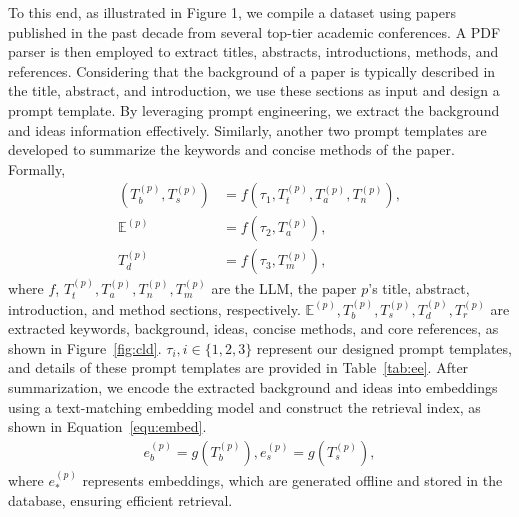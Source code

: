 \documentclass{article}
\theoremstyle{plain}
\theoremstyle{definition}
\theoremstyle{remark}
\begin{document}
To this end, as illustrated in Figure 1, we compile a dataset using papers published in the past decade from several top-tier academic conferences. A PDF parser is then employed to extract titles, abstracts, introductions, methods, and references.
Considering that the background of a paper is typically described in the title, abstract, and introduction, we use these sections as input and design a prompt template. By leveraging prompt engineering, we extract the background and ideas information effectively.
Similarly, another two prompt templates are developed to summarize the keywords and concise methods of the paper. Formally, 
\begin{equation}
\begin{aligned}
(T_b^{(p)}, T_s^{(p)}) &= f(\tau_1, T_t^{(p)}, T_a^{(p)}, T_n^{(p)}), \\ 
\mathbb{E}^{(p)} &= f(\tau_2, T_a^{(p)}), \\
T_d^{(p)} &= f(\tau_3, T_m^{(p)}),
\end{aligned}
\end{equation}
where $f$, $T_t^{(p)}, T_a^{(p)}, T_n^{(p)}, T_m^{(p)}$ are the LLM, the paper $p$'s title, abstract, introduction, and method sections, respectively. $\mathbb{E}^{(p)}, T_b^{(p)}, T_s^{(p)}, T_d^{(p)}, T_r^{(p)}$ are extracted keywords, background, ideas, concise methods, and core references, as shown in Figure~\ref{fig:cld}. $\tau_i, i \in \{1, 2, 3\}$ represent our designed prompt templates, and details of these prompt templates are provided in Table~\ref{tab:ee}.
After summarization, we encode the extracted background and ideas into embeddings using a text-matching embedding model and construct the retrieval index, as shown in Equation~\eqref{equ:embed}.
\begin{equation}
\begin{aligned} \label{equ:embed}
e_b^{(p)} = g(T_b^{(p)}), e_s^{(p)} = g(T_s^{(p)}),
\end{aligned}
\end{equation}
where $e_*^{(p)}$ represents embeddings, which are generated offline and stored in the database, ensuring efficient retrieval.
\end{document}
